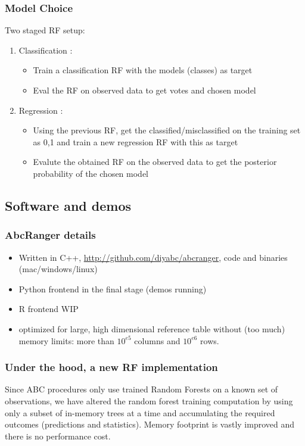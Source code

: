 \documentclass{beamer}
\begin{document}
    \begin{frame}
        \frametitle{Model Choice}
        Two staged RF setup:
        \begin{enumerate}
            \item Classification :
                \begin{itemize}
                    \item Train a classification RF with the models (classes) as target
                    \item Eval the RF on observed data to get votes and chosen model
                
                \end{itemize}
            \item Regression : 
                \begin{itemize}
                    \item Using the previous RF, get the classified/misclassified on the training set as 0,1 and train a new regression RF with this as target
                    \item Evalute the obtained RF on the observed data to get the posterior probability of the chosen model
                \end{itemize}
        \end{enumerate}
    \end{frame}

    \subsection{Software and demos}
    \begin{frame}
        \frametitle{AbcRanger details}
        \begin{itemize}
            \item Written in C++, \url{http://github.com/diyabc/abcranger}, code and binaries (mac/windows/linux)
            \item Python frontend in the final stage (demos running)
            \item R frontend WIP
            \item optimized for large, high dimensional reference table without (too much) memory limits: more than $10^{e5}$ columns and $10^{e6}$ rows.
        \end{itemize}
    \end{frame}

    \begin{frame}
        \frametitle{Under the hood, a new RF implementation}
        Since ABC procedures only use trained Random Forests on a known set of observations, we have altered the random forest training computation by using only a subset of in-memory trees at a time and accumulating the required outcomes (predictions and statistics). Memory footprint is vastly improved and there is no performance cost.

        \begin{figure}
          \centering
          \fontsize{6pt}{7.2}\selectfont
          
        \end{figure}
    
    \end{frame}
\end{document}
